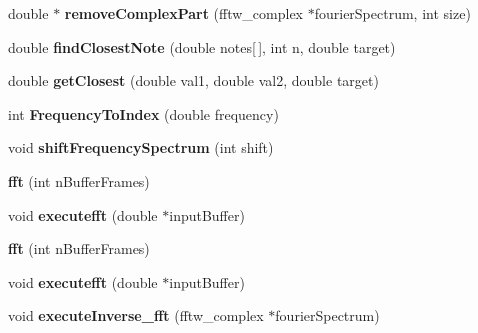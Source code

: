 \begin{DoxyCompactItemize}
\item 
\hypertarget{classfft_a643182c5ca6b24b40c1e8744fc953953}{double $\ast$ {\bfseries remove\-Complex\-Part} (fftw\-\_\-complex $\ast$fourier\-Spectrum, int size)}\label{classfft_a643182c5ca6b24b40c1e8744fc953953}

\item 
\hypertarget{classfft_aa7a241b05f62358ba02a94972edf3a7e}{double {\bfseries find\-Closest\-Note} (double notes\mbox{[}$\,$\mbox{]}, int n, double target)}\label{classfft_aa7a241b05f62358ba02a94972edf3a7e}

\item 
\hypertarget{classfft_aabc3e2a71e82354eb9a32f74a05fc827}{double {\bfseries get\-Closest} (double val1, double val2, double target)}\label{classfft_aabc3e2a71e82354eb9a32f74a05fc827}

\item 
\hypertarget{classfft_a56763f8e5f244be9c6c52e74b56a9686}{int {\bfseries Frequency\-To\-Index} (double frequency)}\label{classfft_a56763f8e5f244be9c6c52e74b56a9686}

\item 
\hypertarget{classfft_a18b1a6865cc0e16f073ee3c0e6815fa4}{void {\bfseries shift\-Frequency\-Spectrum} (int shift)}\label{classfft_a18b1a6865cc0e16f073ee3c0e6815fa4}

\item 
\hypertarget{classfft_a5fff94ac07119207ddd05f628be5891d}{{\bfseries fft} (int n\-Buffer\-Frames)}\label{classfft_a5fff94ac07119207ddd05f628be5891d}

\item 
\hypertarget{classfft_a47e58fd4f715ad89a6fad8df9d715bf4}{void {\bfseries executefft} (double $\ast$input\-Buffer)}\label{classfft_a47e58fd4f715ad89a6fad8df9d715bf4}

\item 
\hypertarget{classfft_a5fff94ac07119207ddd05f628be5891d}{{\bfseries fft} (int n\-Buffer\-Frames)}\label{classfft_a5fff94ac07119207ddd05f628be5891d}

\item 
\hypertarget{classfft_a47e58fd4f715ad89a6fad8df9d715bf4}{void {\bfseries executefft} (double $\ast$input\-Buffer)}\label{classfft_a47e58fd4f715ad89a6fad8df9d715bf4}

\item 
\hypertarget{classfft_a228bd861564c189cd7b6800c950a1c09}{void {\bfseries execute\-Inverse\-\_\-fft} (fftw\-\_\-complex $\ast$fourier\-Spectrum)}\label{classfft_a228bd861564c189cd7b6800c950a1c09}


\end{DoxyCompactItemize}

